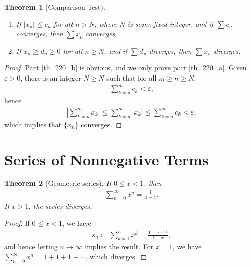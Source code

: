 \documentclass[10pt]{book}
\newtheorem{theorem}{Theorem}[chapter]
\theoremstyle{definition}
\numberwithin{equation}{chapter}
\begin{document}
\begin{theorem}[Comparison Test]\label{th_220}
~\begin{enumerate}[label=(\alph*)]
    \item If $\left|x_n\right| \leq c_n$ for all $n > N$, where $N$ is some fixed integer, and if $\sum c_n$ converges, then $\sum x_n$ converges. \label{th_220_a}
    
    \item If $x_n \geq d_n \geq 0$ for all $n \geq N$, and if $\sum d_n$ diverges, then $\sum x_n$ diverges. \label{th_220_b}
\end{enumerate}
\end{theorem}
\begin{proof}
Part \ref{th_220_b} is obvious, and we only prove part \ref{th_220_a}. Given $\varepsilon > 0$, there is an integer $\widetilde{N} \geq N$ such that for all $m \geq n \geq \widetilde{N}$, 
\begin{align*}
    \sum^m_{k=n} c_k < \varepsilon,
\end{align*}
hence
\begin{align*}
    \left|\sum^m_{k=n} x_k\right| \leq \sum^m_{k=n} \left|x_k\right| \leq \sum^m_{k=n} c_k < \varepsilon,
\end{align*}
which implies that $\{x_n\}$ converges.
\end{proof}

\medskip



\section{Series of Nonnegative Terms}

\begin{theorem}[Geometric series]\label{th_221}
If $0 \leq x < 1$, then
\begin{align*}
    \sum^\infty_{n=0} x^n = \frac{1}{1 - x}.
\end{align*}
If $x > 1$, the series diverges.
\end{theorem}
\begin{proof}
If $0 \leq x < 1$, we have
\begin{align*}
    s_n \coloneqq \sum^n_{k=1} x^k = \frac{1 - x^{n+1}}{1 - x},
\end{align*}
and hence letting $n \to \infty$ implies the result. For $x = 1$, we have $\sum^\infty_{n=0} x^n = 1 + 1 + 1 + \cdots$, which diverges. 
\end{proof}

\medskip
\end{document}
